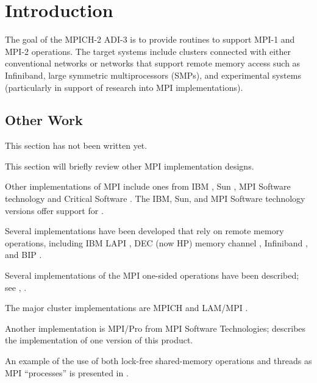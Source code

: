 %
%

\section{Introduction}
The goal of the MPICH-2 ADI-3 is to provide routines to support MPI-1
and MPI-2 operations.  The target systems include clusters connected
with either conventional networks or networks that support remote
memory access such as Infiniband, large symmetric multiprocessors
(SMPs), and experimental systems (particularly in support of research
into MPI implementations).  

\subsection{Other Work}
\label{sec:other-work}

This section has not been written yet.

This section will briefly review other MPI implementation designs.  

Other implementations of MPI include ones from IBM \cite{mpi-ibm},
Sun \cite{hat01:sun-mpi}, MPI Software technology \cite{mpi-softtech} and
Critical Software \cite{mpi-critical-software}.  The IBM, Sun, and MPI
Software technology versions offer support for .

Several implementations have been developed that rely on remote memory
operations, including IBM LAPI \cite{mpi-LAPI99}, DEC (now HP) memory
channel \cite{DEC-memchannel2}, Infiniband
\cite{mpi-infiniband}, and BIP \cite{mpi-bip}.  

Several implementations of the MPI one-sided operations have been
described; see \cite{mpi-sun-rma}, \cite{mpi-fujitsu-rma}.

The major cluster implementations are MPICH
\cite{gropp-lusk-doss-skjellum:mpich} and LAM/MPI \cite{lam,lam-www-iu}.  

Another implementation is MPI/Pro from MPI Software Technologies;
\cite{mpi-rossum} describes the implementation of one version of this
product. 

An example of the use of both lock-free shared-memory operations and threads
as MPI ``processes'' is presented in \cite{tang00:mpi-impl}.  

